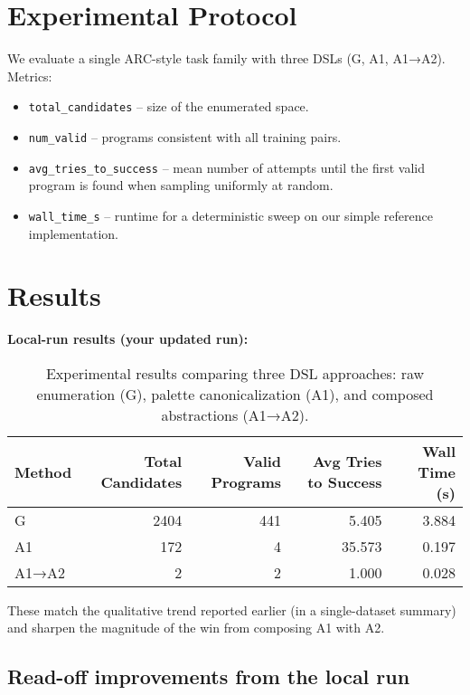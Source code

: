 \documentclass[11pt]{article}
\newcommand{\code}[1]{\texttt{#1}}
\begin{document}
\section{Experimental Protocol}

We evaluate a single ARC-style task family with three DSLs (G, A1, A1→A2). Metrics:
\begin{itemize}
\item \code{total\_candidates} -- size of the enumerated space.
\item \code{num\_valid} -- programs consistent with all training pairs.
\item \code{avg\_tries\_to\_success} -- mean number of attempts until the first valid program is found when sampling uniformly at random.
\item \code{wall\_time\_s} -- runtime for a deterministic sweep on our simple reference implementation.
\end{itemize}

\section{Results}

\textbf{Local-run results (your updated run):}

\begin{table}[h]
\centering
\begin{tabular}{@{}lrrrr@{}}
\toprule
\textbf{Method} & \textbf{Total Candidates} & \textbf{Valid Programs} & \textbf{Avg Tries to Success} & \textbf{Wall Time (s)} \\
\midrule
G & 2404 & 441 & 5.405 & 3.884 \\
A1 & 172 & 4 & 35.573 & 0.197 \\
A1→A2 & 2 & 2 & 1.000 & 0.028 \\
\bottomrule
\end{tabular}
\caption{Experimental results comparing three DSL approaches: raw enumeration (G), palette canonicalization (A1), and composed abstractions (A1→A2).}
\label{tab:results}
\end{table}

These match the qualitative trend reported earlier (in a single-dataset summary) and sharpen the magnitude of the win from composing A1 with A2.

\subsection{Read-off improvements from the local run}
\end{document}

